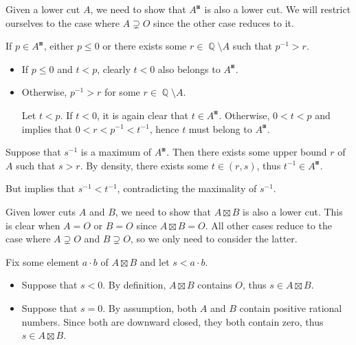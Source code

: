 \begin{defproof}
   Given a lower cut \( A \), we need to show that \( A^\boxast \) is also a lower cut. We will restrict ourselves to the case where \( A \supsetneq O \) since the other case reduces to it.

   If \( p \in A^\boxast \), either \( p \leq 0 \) or there exists some \( r \in \BbbQ \setminus A \) such that \( p^{-1} > r \).

  \begin{itemize}
    \item If \( p \leq 0 \) and \( t < p \), clearly \( t < 0 \) also belongs to \( A^\boxast \).

    \item Otherwise, \( p^{-1} > r \) for some \( r \in \BbbQ \setminus A \).

    Let \( t < p \). If \( t < 0 \), it is again clear that \( t \in A^\boxast \). Otherwise, \( 0 < t < p \) and  implies that \( 0 < r < p^{-1} < t^{-1} \), hence \( t \) must belong to \( A^\boxast \).
  \end{itemize}

   Suppose that \( s^{-1} \) is a maximum of \( A^\boxast \). Then there exists some upper bound \( r \) of \( A \) such that \( s > r \). By density, there exists some \( t \in (r, s) \), thus \( t^{-1} \in A^\boxast \).

  But  implies that \( s^{-1} < t^{-1} \), contradicting the maximality of \( s^{-1} \).

   Given lower cuts \( A \) and \( B \), we need to show that \( A \boxtimes B \) is also a lower cut. This is clear when \( A = O \) or \( B = O \) since \( A \boxtimes B = O \). All other cases reduce to the case where \( A \supsetneq O \) and \( B \supsetneq O \), so we only need to consider the latter.

   Fix some element \( a \cdot b \) of \( A \boxtimes B \) and let \( s < a \cdot b \).

  \begin{itemize}
    \item Suppose that \( s < 0 \). By definition, \( A \boxtimes B \) contains \( O \), thus \( s \in A \boxtimes B \).

    \item Suppose that \( s = 0 \). By assumption, both \( A \) and \( B \) contain positive rational numbers. Since both are downward closed, they both contain zero, thus \( s \in A \boxtimes B \).


\end{itemize}
\end{defproof}
